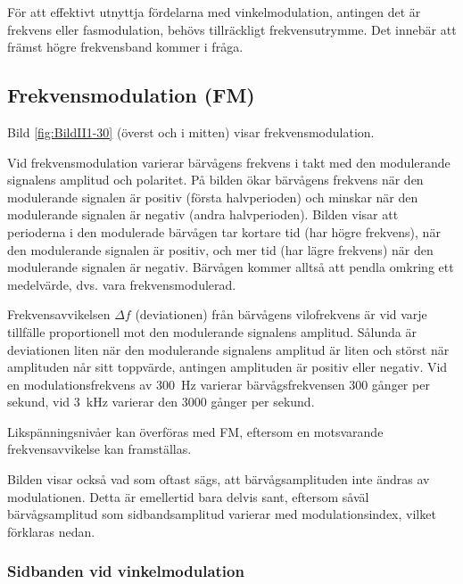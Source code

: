 För att effektivt utnyttja fördelarna med vinkelmodulation, antingen det är
frekvens eller fasmodulation, behövs tillräckligt frekvensutrymme.
Det innebär att främst högre frekvensband kommer i fråga.

\subsection{Frekvensmodulation (FM)}
\label{modulation_fm}


Bild \ref{fig:BildII1-30} (överst och i mitten) visar frekvensmodulation.

Vid frekvensmodulation varierar bärvågens frekvens i takt med den modulerande
signalens amplitud och polaritet.
På bilden ökar bärvågens frekvens när den modulerande signalen är positiv
(första halvperioden) och minskar när den modulerande signalen är negativ
(andra halvperioden).
Bilden visar att perioderna i den modulerade bärvågen tar kortare tid (har
högre frekvens), när den modulerande signalen är positiv, och mer tid (har lägre
frekvens) när den modulerande signalen är negativ.
Bärvågen kommer alltså att pendla omkring ett medelvärde, dvs. vara
frekvensmodulerad.

Frekvensavvikelsen \(\Delta f\) (deviationen) från bärvågens vilofrekvens är
vid varje tillfälle proportionell mot den modulerande signalens amplitud.
Sålunda är deviationen liten när den modulerande signalens amplitud är liten
och störst när amplituden når sitt toppvärde, antingen amplituden är positiv
eller negativ.
Vid en modulationsfrekvens av \SI{300}{\hertz} varierar bärvågsfrekvensen 300
gånger per sekund, vid \SI{3}{\kilo\hertz} varierar den 3000 gånger per sekund.

Likspänningsnivåer kan överföras med FM, eftersom en motsvarande
frekvensavvikelse kan framställas.

Bilden visar också vad som oftast sägs, att bärvågsamplituden inte ändras av
modulationen.
Detta är emellertid bara delvis sant, eftersom såväl bärvågsamplitud som
sidbandsamplitud varierar med modulationsindex, vilket förklaras nedan.

\subsubsection{Sidbanden vid vinkelmodulation}

